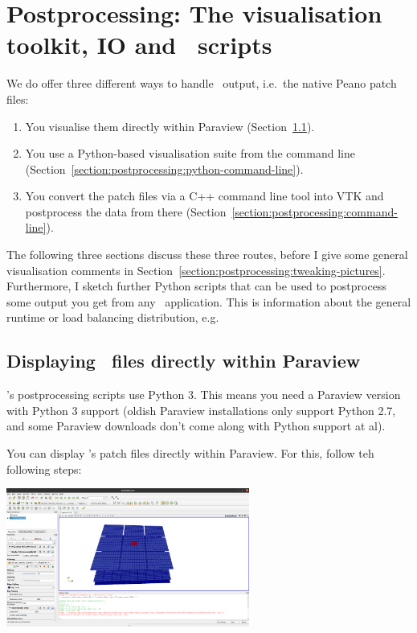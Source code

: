 \chapter{Postprocessing: The visualisation toolkit, IO and \Peano\
scripts}
\label{chapter:postprocessing}



We do offer three different ways to handle \Peano\ output, i.e.~the native Peano
patch files:

\begin{enumerate}
  \item You visualise them directly within Paraview (Section~\ref{label:postprocessing:display-in-paraview}).
  \item You use a Python-based visualisation suite from the command line
  (Section~\ref{section:postprocessing:python-command-line}).
  \item You convert the patch files via a C++ command line tool into VTK and
  postprocess the data from there
  (Section~\ref{section:postprocessing:command-line}).
\end{enumerate}


\noindent
The following three sections discuss these three routes, before I give some
general visualisation comments in
Section~\ref{section:postprocessing:tweaking-pictures}. 
Furthermore, I sketch further Python scripts that can be used to postprocess
some output you get from any \Peano\ application.
This is information about the general runtime or load balancing distribution,
e.g.


\section{Displaying \Peano\ files directly within Paraview}
\label{label:postprocessing:display-in-paraview}

\begin{remark}
  \Peano's postprocessing scripts use Python 3. This means you need a Paraview
  version with Python 3 support (oldish Paraview installations only support
  Python 2.7, and some Paraview downloads don't come along with Python support
  at al).
\end{remark}


You can display \Peano's patch files directly within Paraview. For this, follow
teh following steps:

\begin{center}
 \includegraphics[width=0.6\textwidth]{80_postprocessing/paraview.png}
\end{center}




